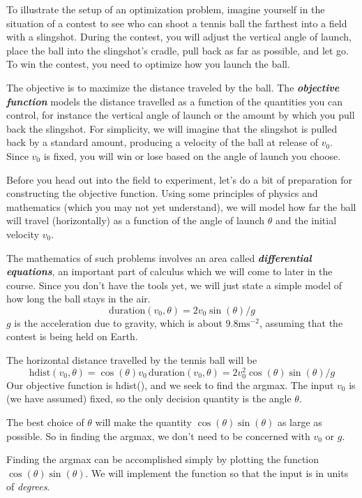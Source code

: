 \documentclass[
  letterpaper,
  DIV=11,
  numbers=noendperiod,
  oneside]{scrreprt}
\begin{document}
To illustrate the setup of an optimization problem, imagine yourself in
the situation of a contest to see who can shoot a tennis ball the
farthest into a field with a slingshot. During the contest, you will
adjust the vertical angle of launch, place the ball into the slingshot's
cradle, pull back as far as possible, and let go. To win the contest,
you need to optimize how you launch the ball.

The objective is to maximize the distance traveled by the ball. The
\textbf{\emph{objective function}} models the distance travelled as a
function of the quantities you can control, for instance the vertical
angle of launch or the amount by which you pull back the slingshot. For
simplicity, we will imagine that the slingshot is pulled back by a
standard amount, producing a velocity of the ball at release of \(v_0\).
Since \(v_0\) is fixed, you will win or lose based on the angle of
launch you choose.

Before you head out into the field to experiment, let's do a bit of
preparation for constructing the objective function. Using some
principles of physics and mathematics (which you may not yet
understand), we will model how far the ball will travel (horizontally)
as a function of the angle of launch \(\theta\) and the initial velocity
\(v_0\).

The mathematics of such problems involves an area called
\textbf{\emph{differential equations}}, an important part of calculus
which we will come to later in the course. Since you don't have the
tools yet, we will just state a simple model of how long the ball stays
in the air. \[\text{duration}(v_0, \theta) = 2 v_0 \sin(\theta)/g\]
\(g\) is the acceleration due to gravity, which is about
\(9.8 \text{m}\text{s}^{-2}\), assuming that the contest is being held
on Earth.

The horizontal distance travelled by the tennis ball will be
\[\text{hdist}(v_0, \theta) = \cos(\theta) v_0\, \text{duration}(v_0, \theta) = 2 v_0^2 \cos(\theta)\sin(\theta) / g\]
Our objective function is hdist(), and we seek to find the argmax. The
input \(v_0\) is (we have assumed) fixed, so the only decision quantity
is the angle \(\theta\).

The best choice of \(\theta\) will make the quantity
\(\cos(\theta)\sin(\theta)\) as large as possible. So in finding the
argmax, we don't need to be concerned with \(v_0\) or \(g\).

Finding the argmax can be accomplished simply by plotting the function
\(\cos(\theta)\sin(\theta)\). We will implement the function so that the
input is in units of \emph{degrees}.
\end{document}
